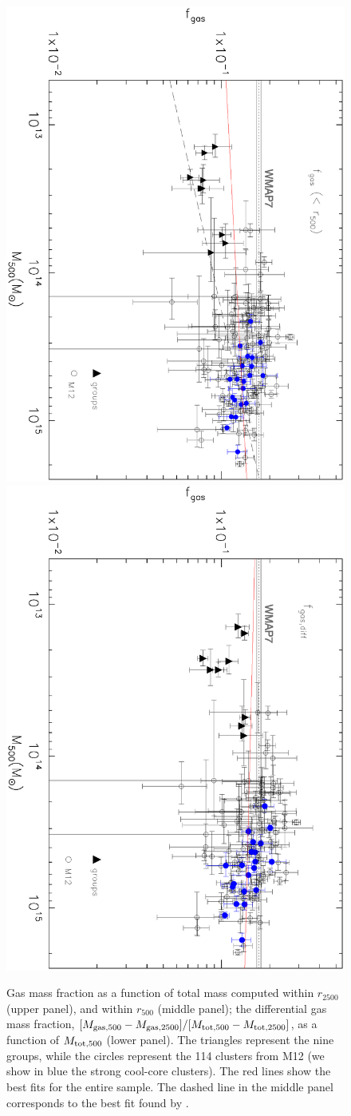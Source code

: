 \documentclass{aa}
\begin{document}
\begin{figure}[ht!]
\includegraphics[angle=90,width=9.cm]{Fgas_grupos+Maughan_r500MtotEH.ps}
\includegraphics[angle=90,width=9.cm]{FgasAnel_grupos+Maughan_HE.ps}
\caption{Gas mass fraction as a function of total mass computed within
  $r_{2500}$ (upper panel), and within $r_{500}$ (middle panel); 
  the differential gas mass fraction, $[M_{\rm gas,500} - M_{\rm gas,2500}] / [M_{\rm tot,500} - M_{\rm tot,2500}]$,
    as a
  function of $M_{\rm tot,500}$ (lower panel).  The triangles represent the nine groups,
  while the circles represent the 114 clusters from M12 (we
  show in blue the strong cool-core clusters).
  The red
  lines show the best fits for the entire sample. The dashed line in the
  middle panel corresponds to the best fit found by \citet{lagana11}.}
\label{fig:fracgas}
\end{figure}
\end{document}
